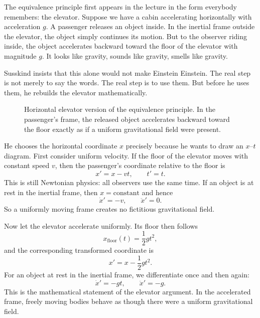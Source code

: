 The equivalence principle first appears in the lecture in the form everybody remembers: the elevator. Suppose we have a cabin accelerating horizontally with acceleration $g$. A passenger releases an object inside. In the inertial frame outside the elevator, the object simply continues its motion. But to the observer riding inside, the object accelerates backward toward the floor of the elevator with magnitude $g$. It looks like gravity, sounds like gravity, smells like gravity.

Susskind insists that this alone would not make Einstein Einstein. The real step is not merely to say the words. The real step is to use them. But before he uses them, he rebuilds the elevator mathematically.

\begin{figure}[ht]
\centering
{}
\caption{Horizontal elevator version of the equivalence principle. In the passenger's frame, the released object accelerates backward toward the floor exactly as if a uniform gravitational field were present.}
\end{figure}

He chooses the horizontal coordinate $x$ precisely because he wants to draw an $x$--$t$ diagram. First consider uniform velocity. If the floor of the elevator moves with constant speed $v$, then the passenger's coordinate relative to the floor is
\begin{equation}
x' = x-vt,
\qquad
t'=t.
\end{equation}
This is still Newtonian physics: all observers use the same time. If an object is at rest in the inertial frame, then $x=\text{constant}$ and hence
\begin{equation}
\dot x' = -v,
\qquad
\ddot x' = 0.
\end{equation}
So a uniformly moving frame creates no fictitious gravitational field.

Now let the elevator accelerate uniformly. Its floor then follows
\begin{equation}
x_{\mathrm{floor}}(t)=\frac{1}{2}gt^2,
\end{equation}
and the corresponding transformed coordinate is
\begin{equation}
x' = x-\frac{1}{2}gt^2.
\end{equation}
For an object at rest in the inertial frame, we differentiate once and then again:
\begin{equation}
\dot x' = -gt,
\qquad
\ddot x' = -g.
\end{equation}
This is the mathematical statement of the elevator argument. In the accelerated frame, freely moving bodies behave as though there were a uniform gravitational field.

